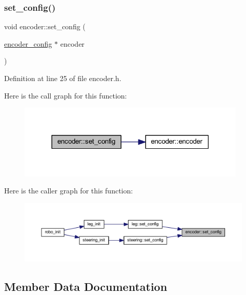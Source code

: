 \subsubsection{\texorpdfstring{set\_config()}{set\_config()}}
{\footnotesize\ttfamily void encoder\+::set\+\_\+config (\begin{DoxyParamCaption}\item[{\mbox{\hyperlink{structencoder__config}{encoder\+\_\+config}} $\ast$}]{encoder }\end{DoxyParamCaption})\hspace{0.3cm}{\ttfamily [inline]}}



Definition at line 25 of file encoder.\+h.

Here is the call graph for this function\+:
\nopagebreak
\begin{figure}[H]
\begin{center}
\leavevmode
\includegraphics[width=309pt]{classencoder_afb36996f08db7f27e2df5334f90c8e53_cgraph}
\end{center}
\end{figure}
Here is the caller graph for this function\+:
\nopagebreak
\begin{figure}[H]
\begin{center}
\leavevmode
\includegraphics[width=350pt]{classencoder_afb36996f08db7f27e2df5334f90c8e53_icgraph}
\end{center}
\end{figure}


\subsection{Member Data Documentation}
\mbox{\label{classencoder_a1eaaad413fa84f01afad8db46bd8d4d3}} 
